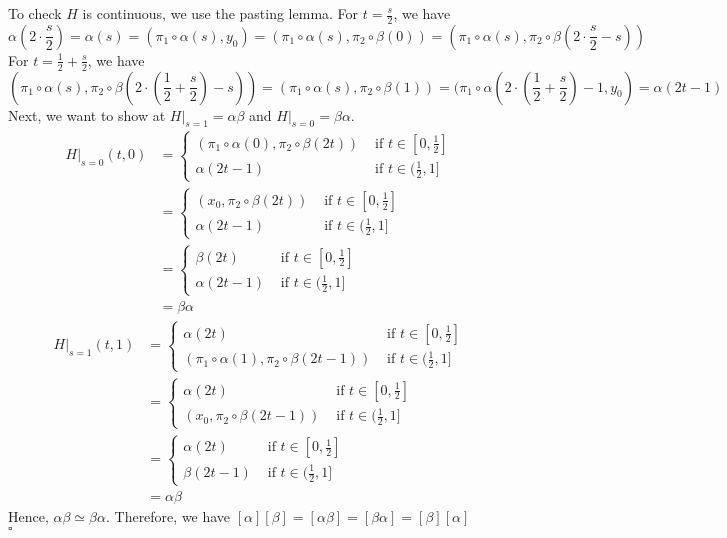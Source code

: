 \documentclass[12pt]{amsart}
\begin{document}
To check $H$ is continuous, we use the pasting lemma. For $t=\frac{s}{2}$, we have
\[\alpha(2\cdot \frac{s}{2})=\alpha(s)=(\pi_1\circ\alpha(s),y_0)=(\pi_1\circ\alpha(s),\pi_2\circ \beta(0))=(\pi_1\circ \alpha(s),\pi_2\circ \beta(2\cdot\frac{s}{2}-s))\]
For $t=\frac{1}{2}+\frac{s}{2}$, we have
\[(\pi_1\circ \alpha(s),\pi_2\circ \beta(2\cdot(\frac{1}{2}+\frac{s}{2})-s))=(\pi_1\circ \alpha(s),\pi_2\circ \beta(1))=(\pi_1\circ \alpha(2\cdot(\frac{1}{2}+\frac{s}{2})-1,y_0)=\alpha(2t-1)\]
Next, we want to show at $H|_{s=1}=\alpha\beta$ and $H|_{s=0}=\beta\alpha$.
\begin{align*}H|_{s=0}(t,0) & =
    \begin{cases}
        (\pi_1\circ\alpha(0),\pi_2\circ \beta(2t)) & \text{ if } t\in [0,\frac{1}{2}] \\
        \alpha(2t-1)                               & \text{ if } t\in (\frac{1}{2},1]
    \end{cases}                  \\
                  & =\begin{cases}
        (x_0,\pi_2\circ \beta(2t)) & \text{ if } t\in [0,\frac{1}{2}] \\
        \alpha(2t-1)               & \text{ if } t\in (\frac{1}{2},1]
    \end{cases} \\
                  & =\begin{cases}
        \beta(2t)    & \text{ if } t\in [0,\frac{1}{2}] \\
        \alpha(2t-1) & \text{ if } t\in (\frac{1}{2},1]
    \end{cases} \\
                  & =\beta\alpha
\end{align*}
\begin{align*}H|_{s=1}(t,1) & =\begin{cases}
        \alpha(2t)                                   & \text{ if } t\in [0,\frac{1}{2}] \\
        (\pi_1\circ\alpha(1),\pi_2\circ \beta(2t-1)) & \text{ if } t\in (\frac{1}{2},1]
    \end{cases}  \\
                  & =\begin{cases}
        \alpha(2t)                   & \text{ if } t\in [0,\frac{1}{2}] \\
        (x_0,\pi_2\circ \beta(2t-1)) & \text{ if } t\in (\frac{1}{2},1]
    \end{cases} \\
                  & =\begin{cases}
        \alpha(2t)  & \text{ if } t\in [0,\frac{1}{2}] \\
        \beta(2t-1) & \text{ if } t\in (\frac{1}{2},1]
    \end{cases} \\
                  & =\alpha\beta
\end{align*}
Hence, $\alpha\beta\simeq\beta\alpha$. Therefore, we have $[\alpha][\beta]=[\alpha\beta]=[\beta\alpha]=[\beta][\alpha]$
\\\phantom{qed}\hfill$\square$\\
\end{document}
